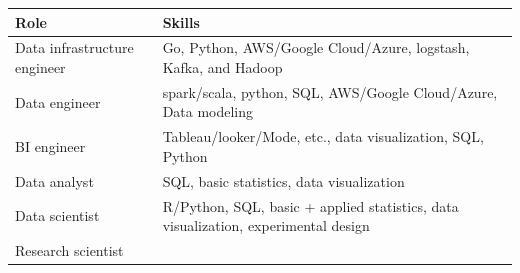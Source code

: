 \documentclass[12pt,]{krantz}
\begin{document}
\begin{longtable}[]{@{}ll@{}}
\toprule
\begin{minipage}[b]{0.47\columnwidth}\raggedright
Role\strut
\end{minipage} & \begin{minipage}[b]{0.47\columnwidth}\raggedright
Skills\strut
\end{minipage}\tabularnewline
\midrule
\endhead
\begin{minipage}[t]{0.47\columnwidth}\raggedright
Data infrastructure engineer\strut
\end{minipage} & \begin{minipage}[t]{0.47\columnwidth}\raggedright
Go, Python, AWS/Google Cloud/Azure, logstash, Kafka, and Hadoop\strut
\end{minipage}\tabularnewline
\begin{minipage}[t]{0.47\columnwidth}\raggedright
Data engineer\strut
\end{minipage} & \begin{minipage}[t]{0.47\columnwidth}\raggedright
spark/scala, python, SQL, AWS/Google Cloud/Azure, Data modeling\strut
\end{minipage}\tabularnewline
\begin{minipage}[t]{0.47\columnwidth}\raggedright
BI engineer\strut
\end{minipage} & \begin{minipage}[t]{0.47\columnwidth}\raggedright
Tableau/looker/Mode, etc., data visualization, SQL, Python\strut
\end{minipage}\tabularnewline
\begin{minipage}[t]{0.47\columnwidth}\raggedright
Data analyst\strut
\end{minipage} & \begin{minipage}[t]{0.47\columnwidth}\raggedright
SQL, basic statistics, data visualization\strut
\end{minipage}\tabularnewline
\begin{minipage}[t]{0.47\columnwidth}\raggedright
Data scientist\strut
\end{minipage} & \begin{minipage}[t]{0.47\columnwidth}\raggedright
R/Python, SQL, basic + applied statistics, data visualization, experimental design\strut
\end{minipage}\tabularnewline
\begin{minipage}[t]{0.47\columnwidth}\raggedright
Research scientist\strut
\end{minipage} & \begin{minipage}[t]{0.47\columnwidth}\raggedright

\end{minipage}
\end{longtable}
\end{document}
